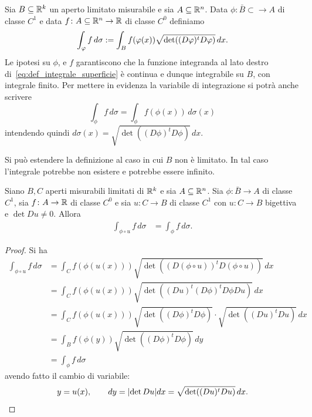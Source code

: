 \begin{definition}
  \label{def:integrale_superficie}
Sia $B\subseteq {\mathbb R}^k$ un aperto limitato misurabile e sia $A\subseteq {\mathbb R}^n$.
Data $\phi\colon \bar B\subset \to A$ di classe $C^1$ 
e data $f\colon A\subseteq {\mathbb R}^n\to {\mathbb R}$ di classe $C^0$
definiamo
\begin{equation}\label{eq:def_integrale_superficie}
  \int_\varphi f \, d\sigma 
  := \int_B f(\varphi(x)) \sqrt{\det ((D\varphi)^t D\varphi)}\, dx.
\end{equation}
Le ipotesi su $\phi$, e $f$ garantiscono 
che la funzione integranda al lato destro di~\eqref{eq:def_integrale_superficie} è
continua e dunque integrabile su $B$, con integrale finito. 
Per mettere in evidenza la variabile di integrazione si potrà anche scrivere 
\[
  \int_\phi f \, d\sigma = \int_\phi f(\phi(x)) \, d\sigma(x)
\]
intendendo quindi
$d\sigma(x) = \sqrt{\det ((D\phi)^t D\phi)}\, dx$.

Si può estendere la definizione al caso in cui $B$ non è limitato. 
In tal caso l'integrale potrebbe non esistere e potrebbe essere infinito.
\end{definition}

\begin{theorem}
Siano $B,C$ aperti misurabili limitati di ${\mathbb R}^k$ e sia $A\subseteq {\mathbb R}^n$.
Sia $\phi\colon \bar B \to A$ di classe $C^1$,
sia $f\colon A\to {\mathbb R}$ di classe $C^0$ e sia 
$u\colon C \to B$ di classe $C^1$ 
con $u\colon C\to B$ bigettiva e $\det Du \neq 0$.
Allora 
\begin{align*}
  \int_{\phi\circ u} f \, d\sigma
  &= \int_{\phi} f \, d\sigma.
\end{align*}
\end{theorem}

\begin{proof}
Si ha
\begin{align*}
  \int_{\phi\circ u} f \, d\sigma 
  &= \int_C f(\phi(u(x))) \sqrt{\det ((D(\phi\circ u))^t D(\phi\circ u))}\, dx \\
  &= \int_C f(\phi(u(x))) \sqrt{\det ((Du)^t (D\phi)^t D\phi Du)}\, dx \\
  &= \int_C f(\phi(u(x))) \sqrt{\det ((D\phi)^t D\phi)}\cdot \sqrt{\det ((Du)^t Du)}\, dx \\
  &= \int_B f(\phi(y)) \sqrt{\det ((D\phi)^t D\phi)}\, dy\\
  &= \int_{\phi} f \, d\sigma
\end{align*}
avendo fatto il cambio di variabile:
\[
  y = u(x), \qquad dy = {\left|\det Du\right|} dx = \sqrt{\det ((Du)^t Du)}\, dx.
\]
\end{proof}

